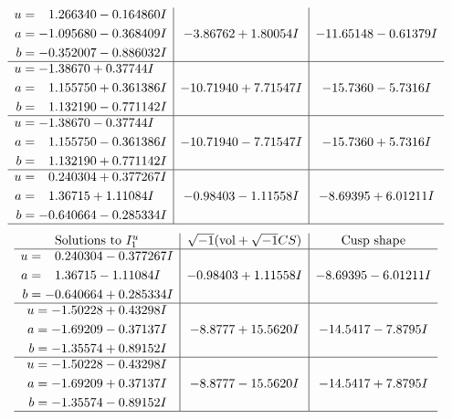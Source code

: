 \documentclass[1p]{elsarticle_modified}
\theoremstyle{definition}
\newcommand{\I}{\sqrt{-1}}
\begin{document}
$$\begin{array}{c|c|c}
\begin{aligned}
u &= \phantom{-}1.266340 - 0.164860 I \\
a &= -1.095680 - 0.368409 I \\
b &= -0.352007 - 0.886032 I\end{aligned}
 & -3.86762 + 1.80054 I & -11.65148 - 0.61379 I \\ \hline\begin{aligned}
u &= -1.38670 + 0.37744 I \\
a &= \phantom{-}1.155750 + 0.361386 I \\
b &= \phantom{-}1.132190 - 0.771142 I\end{aligned}
 & -10.71940 + 7.71547 I & -15.7360 - 5.7316 I \\ \hline\begin{aligned}
u &= -1.38670 - 0.37744 I \\
a &= \phantom{-}1.155750 - 0.361386 I \\
b &= \phantom{-}1.132190 + 0.771142 I\end{aligned}
 & -10.71940 - 7.71547 I & -15.7360 + 5.7316 I \\ \hline\begin{aligned}
u &= \phantom{-}0.240304 + 0.377267 I \\
a &= \phantom{-}1.36715 + 1.11084 I \\
b &= -0.640664 - 0.285334 I\end{aligned}
 & -0.98403 - 1.11558 I & -8.69395 + 6.01211 I\\
 \hline 
 \end{array}$$\newpage$$\begin{array}{c|c|c}  
\text{Solutions to }I^u_{1}& \I (\text{vol} + \sqrt{-1}CS) & \text{Cusp shape}\\
 \hline 
\begin{aligned}
u &= \phantom{-}0.240304 - 0.377267 I \\
a &= \phantom{-}1.36715 - 1.11084 I \\
b &= -0.640664 + 0.285334 I\end{aligned}
 & -0.98403 + 1.11558 I & -8.69395 - 6.01211 I \\ \hline\begin{aligned}
u &= -1.50228 + 0.43298 I \\
a &= -1.69209 - 0.37137 I \\
b &= -1.35574 + 0.89152 I\end{aligned}
 & -8.8777 + 15.5620 I & -14.5417 - 7.8795 I \\ \hline\begin{aligned}
u &= -1.50228 - 0.43298 I \\
a &= -1.69209 + 0.37137 I \\
b &= -1.35574 - 0.89152 I\end{aligned}
 & -8.8777 - 15.5620 I & -14.5417 + 7.8795 I\\
 \hline 
 \end{array}$$\newpage\newpage\renewcommand{\arraystretch}{1}
\end{document}
